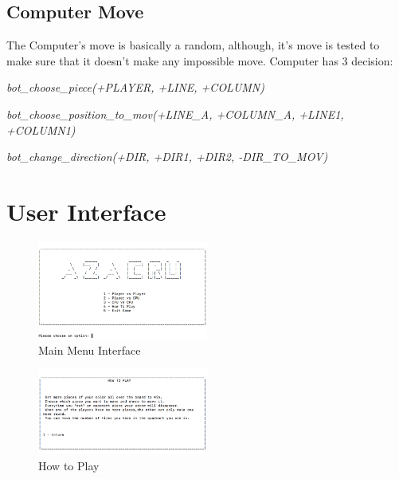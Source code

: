 \documentclass[a4paper]{article}
\begin{document}
\subsection{Computer Move} 
The Computer's move is basically a random, although, it's move is tested to make sure that it doesn't make any impossible move. Computer has 3 decision:
\vspace{5mm}

\textit{bot\_choose\_piece(+PLAYER, +LINE, +COLUMN)}

\textit{bot\_choose\_position\_to\_mov(+LINE\_A, +COLUMN\_A, +LINE1, +COLUMN1)}

\textit{bot\_change\_direction(+DIR, +DIR1, +DIR2, -DIR\_TO\_MOV)}

\vspace{10mm}

\section{User Interface}

\begin{figure}[H]
    \centering
    \includegraphics[width=0.5\textwidth]{Imagem3.png}
    \caption{Main Menu Interface}
    \label{fig:i1}
\end{figure}

\begin{figure}[H]
    \centering
    \includegraphics[width=0.5\textwidth]{Imagem4.png}
    \caption{How to Play}
    \label{fig:i2}
\end{figure}
\end{document}
